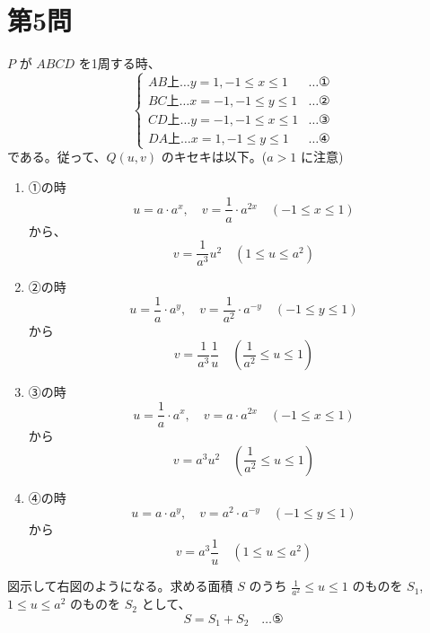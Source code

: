 \documentclass[../main.tex]{subfiles}
\begin{document}
\newpage

\section*{第5問}

\noindent
[\textbf{解}] $P$ が $ABCD$ を1周する時、
\[
  \begin{cases}
    AB \text{上} \dots y = 1, -1 \le x \le 1 & \dots \text{①} \\
    BC \text{上} \dots x = -1, -1 \le y \le 1 & \dots \text{②} \\
    CD \text{上} \dots y = -1, -1 \le x \le 1 & \dots \text{③} \\
    DA \text{上} \dots x = 1, -1 \le y \le 1 & \dots \text{④}
  \end{cases}
\]
である。従って、$Q(u, v)$ のキセキは以下。($a > 1$ に注意)

\begin{enumerate}
  \item[$1^\circ$] ①の時
    \[
      u = a \cdot a^x, \quad v = \frac{1}{a} \cdot a^{2x} \quad (-1 \le x \le 1)
    \]
    から、
    \[
      v = \frac{1}{a^3} u^2 \quad (1 \le u \le a^2)
    \]

  \item[$2^\circ$] ②の時
    \[
      u = \frac{1}{a} \cdot a^y, \quad v = \frac{1}{a^2} \cdot a^{-y} \quad (-1 \le y \le 1)
    \]
    から
    \[
      v = \frac{1}{a^3} \frac{1}{u} \quad \left(\frac{1}{a^2} \le u \le 1\right)
    \]

  \item[$3^\circ$] ③の時
    \[
      u = \frac{1}{a} \cdot a^x, \quad v = a \cdot a^{2x} \quad (-1 \le x \le 1)
    \]
    から
    \[
      v = a^3 u^2 \quad \left(\frac{1}{a^2} \le u \le 1\right)
    \]

  \item[$4^\circ$] ④の時
    \[
      u = a \cdot a^y, \quad v = a^2 \cdot a^{-y} \quad (-1 \le y \le 1)
    \]
    から
    \[
      v = a^3 \frac{1}{u} \quad (1 \le u \le a^2)
    \]
\end{enumerate}

図示して右図のようになる。求める面積 $S$ のうち $\frac{1}{a^2} \le u \le 1$ のものを $S_1$, $1 \le u \le a^2$ のものを $S_2$ として、
\[
  S = S_1 + S_2 \quad \dots \text{⑤}
\]
\end{document}
